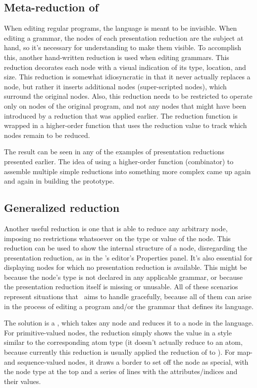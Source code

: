 \subsection{Meta-reduction of }
When editing regular programs, the  language is meant to be invisible. When editing a grammar, the  nodes of each presentation reduction are the subject at hand, so it's necessary for understanding to make them visible. To accomplish this, another hand-written reduction is used when editing grammars. This reduction decorates each node with a visual indication of its type, location, and size. This reduction is somewhat idiosyncratic in that it never actually replaces a node, but rather it inserts additional nodes (super-scripted  nodes), which surround the original nodes. Also, this reduction needs to be restricted to operate only on  nodes of the original program, and not any nodes that might have been introduced by a reduction that was applied earlier. The reduction function is wrapped in a higher-order function that uses the reduction value to track which nodes remain to be reduced.

The result can be seen in any of the examples of presentation reductions presented earlier. The idea of using a higher-order function (combinator) to assemble multiple simple reductions into something more complex came up again and again in building the prototype.


\subsection{Generalized reduction}
Another useful reduction is one that is able to reduce any arbitrary node, imposing no restrictions whatsoever on the type or value of the node. This reduction can be used to show the internal structure of a node, disregarding the presentation reduction, as in the \Meta's editor's Properties panel. It's also essential for displaying nodes for which no presentation reduction is available. This might be because the node's type is not declared in any applicable grammar, or because the presentation reduction itself is missing or unusable. All of these scenarios represent situations that \Meta\ aims to handle gracefully, because all of them can arise in the process of editing a program and/or the grammar that defines its language.

The solution is a , which takes any node and reduces it to a node in the  language. For primitive-valued nodes, the reduction simply shows the value in a style similar to the corresponding  atom type (it doesn't actually reduce to an atom, because currently this reduction is usually applied  the reduction of  to ). For map- and sequence-valued nodes, it draws a border to set off the node as special, with the node type at the top and a series of lines with the attributes/indices and their values.

